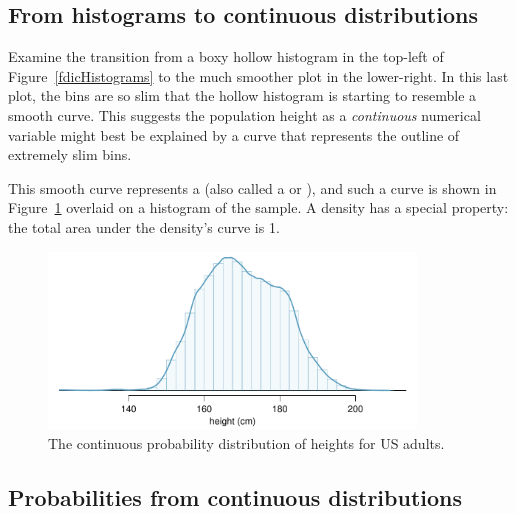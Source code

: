 \subsection{From histograms to continuous distributions}

Examine the transition from a boxy hollow histogram in the top-left of Figure~\ref{fdicHistograms} to the much smoother plot in the lower-right. In this last plot, the bins are so slim that the hollow histogram is starting to resemble a smooth curve. This suggests the population height as a \emph{continuous} numerical variable might best be explained by a curve that represents the outline of extremely slim bins.

This smooth curve represents a  (also called a  or ), and such a curve is shown in Figure~\ref{fdicHeightContDist} overlaid on a histogram of the sample. A density has a special property: the total area under the density's curve is 1.

\begin{figure}[tbh]
\centering
\includegraphics[width=0.87\textwidth]{ch_probability/figures/fdicHeightContDist/fdicHeightContDist}
\caption{The continuous probability distribution of heights for US adults.}
\label{fdicHeightContDist}
\end{figure}


\textPE{\pagebreak}


\subsection{Probabilities from continuous distributions}

